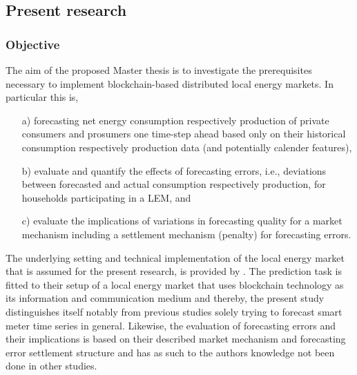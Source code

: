 


\subsection{Present research}\label{Sec:Intro;Subsec:Present}



\subsubsection{Objective}
The aim of the proposed Master thesis is to investigate the prerequisites necessary to implement blockchain-based distributed local energy markets. In particular this is,
\begin{itemize}
    \item[a)] forecasting net energy consumption respectively production of private consumers and prosumers one time-step ahead based only on their historical consumption respectively production data (and potentially calender features),
    \item[b)] evaluate and quantify the effects of forecasting errors, i.e., deviations between forecasted and actual consumption respectively production, for households participating in a LEM, and
    \item[c)] evaluate the implications of variations in forecasting quality for a market mechanism including a settlement mechanism (penalty) for forecasting errors.
\end{itemize}

The underlying setting and technical implementation of the local energy market that is assumed for the present research, is provided by \citet{Mengelkamp:2018a}. The prediction task is fitted to their setup of a local energy market that uses blockchain technology as its information and communication medium and thereby, the present study distinguishes itself notably from previous studies solely trying to forecast smart meter time series in general. Likewise, the evaluation of forecasting errors and their implications is based on their described market mechanism and forecasting error settlement structure and has as such to the authors knowledge not been done in other studies.


